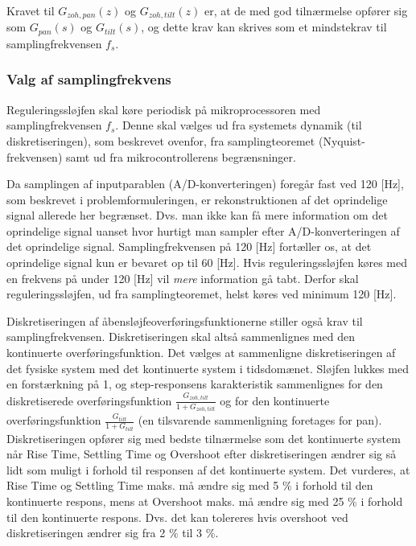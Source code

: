 Kravet til \(G_{zoh,pan}\left(z\right)\) og \(G_{zoh,tilt}\left(z\right)\) er, at de
med god tilnærmelse opfører sig som \(G_{pan}\left(s\right)\) og \(G_{tilt}\left(s\right)\),
og dette krav kan skrives som et mindstekrav til samplingfrekvensen \(f_s\).

\subsubsection{Valg af samplingfrekvens}
\label{subsec:choosefs}
Reguleringssløjfen skal køre periodisk på mikroprocessoren
med samplingfrekvensen \(f_s\). Denne skal vælges
ud fra systemets dynamik (til diskretiseringen), som beskrevet ovenfor,
fra samplingteoremet (Nyquist-frekvensen) samt ud fra
mikrocontrollerens begrænsninger.

Da samplingen af inputparablen (A/D-konverteringen) foregår fast ved 120 [Hz],
som beskrevet i problemformuleringen, er rekonstruktionen
af det oprindelige signal allerede her begrænset. Dvs. man
ikke kan få mere information om det oprindelige signal
uanset hvor hurtigt man sampler efter A/D-konverteringen af
det oprindelige signal.
Samplingfrekvensen på 120 [Hz] fortæller os,
at det oprindelige signal kun er bevaret op til 60 [Hz].
Hvis reguleringssløjfen køres med en frekvens på under 120 [Hz]
vil \textit{mere} information gå tabt.
Derfor skal reguleringssløjfen, ud fra samplingteoremet, helst køres
ved minimum 120 [Hz].

Diskretiseringen af åbensløjfeoverføringsfunktionerne stiller også krav til samplingfrekvensen.
Diskretiseringen skal altså sammenlignes med den kontinuerte overføringsfunktion.
Det vælges at sammenligne diskretiseringen af det fysiske system med det kontinuerte system i tidsdomænet.
Sløjfen lukkes med en forstærkning på 1, og step-responsens karakteristik sammenlignes
for den diskretiserede overføringsfunktion \(\frac{G_{zoh,tilt}}{1+G_{zoh,tilt}}\)
og for den kontinuerte overføringsfunktion \(\frac{G_{tilt}}{1+G_{tilt}}\) (en tilsvarende sammenligning foretages for pan).
Diskretiseringen opfører sig med bedste tilnærmelse som det kontinuerte system
når Rise Time, Settling Time og Overshoot efter diskretiseringen
ændrer sig så lidt som muligt i forhold til responsen af det kontinuerte system.
Det vurderes, at Rise Time og Settling Time maks. må ændre sig med 5 \% i forhold
til den kontinuerte respons, mens at Overshoot maks. må ændre sig med 25 \% i forhold til
den kontinuerte respons.
Dvs. det kan tolereres hvis overshoot
ved diskretiseringen ændrer sig fra 2 \% til 3 \%.

